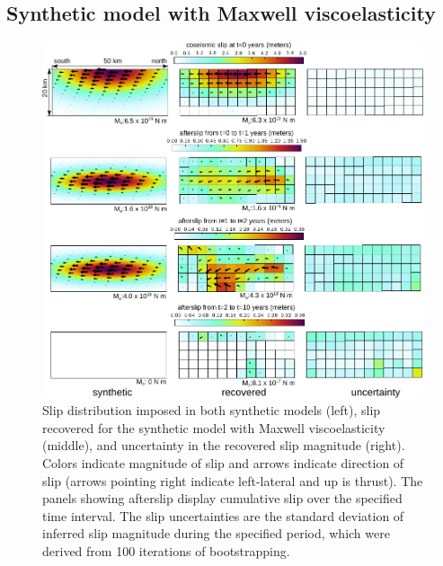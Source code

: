 \subsection{Synthetic model with Maxwell viscoelasticity}\label{MaxModel}

\begin{figure}\label{figure3}
  \includegraphics{ch2/figures/Fig3.pdf}
  \caption{Slip distribution imposed in both synthetic models (left),
    slip recovered for the synthetic model with Maxwell
    viscoelasticity (middle), and uncertainty in the recovered slip
    magnitude (right).  Colors indicate magnitude of slip and arrows
    indicate direction of slip (arrows pointing right indicate
    left-lateral and up is thrust).  The panels showing afterslip
    display cumulative slip over the specified time interval.  The
    slip uncertainties are the standard deviation of inferred slip
    magnitude during the specified period, which were derived from 100
    iterations of bootstrapping.}
\end{figure}

